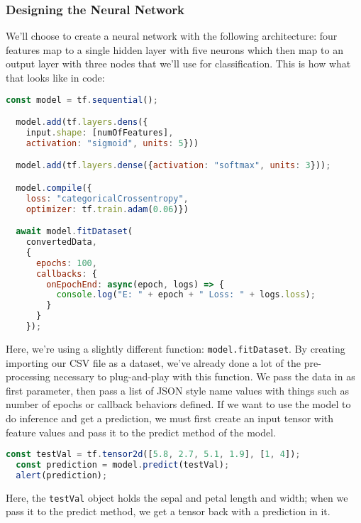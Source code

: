 \documentclass[12pt]{article}
\begin{document}
\subsubsection{Designing the Neural Network} We'll choose to create a neural network with the following architecture: four features map to a single hidden layer with five neurons which then map to an output layer with three nodes that we'll use for classification. This is how what that looks like in code:
\begin{lstlisting}[language=JavaScript]
  const model = tf.sequential();

  model.add(tf.layers.dens({
    input.shape: [numOfFeatures],
    activation: "sigmoid", units: 5}))

  model.add(tf.layers.dense({activation: "softmax", units: 3}));

  model.compile({
    loss: "categoricalCrossentropy",
    optimizer: tf.train.adam(0.06)})

  await model.fitDataset(
    convertedData,
    {
      epochs: 100,
      callbacks: {
        onEpochEnd: async(epoch, logs) => {
          console.log("E: " + epoch + " Loss: " + logs.loss);
        }
      }
    });
  \end{lstlisting}

Here, we're using a slightly different function: \texttt{model.fitDataset}. By creating importing our CSV file as a dataset, we've already done a lot of the pre-processing necessary to plug-and-play with this function. We pass the data in as first parameter, then pass a list of JSON style name values with things such as number of epochs or callback behaviors defined. If we want to use the model to do inference and get a prediction, we must first create an input tensor with feature values and pass it to the predict method of the model.

\begin{lstlisting}[language=JavaScript]
  const testVal = tf.tensor2d([5.8, 2.7, 5.1, 1.9], [1, 4]);
  const prediction = model.predict(testVal);
  alert(prediction);
\end{lstlisting}

Here, the \texttt{testVal} object holds the sepal and petal length and width; when we pass it to the predict method, we get a tensor back with a prediction in it.
\end{document}
